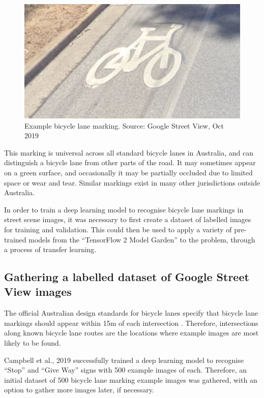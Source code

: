 \documentclass[11pt,twoside]{report}
\begin{document}
\begin{figure}[h]
\centering
\includegraphics{f001_symbol.png}
\caption{Example bicycle lane marking.  Source: Google Street View, Oct 2019}
\label{fig:symbol}
\end{figure}

This marking is universal across all standard bicycle lanes in Australia, and can distinguish a bicycle lane from other parts of the road.  It may sometimes appear on a green surface, and occasionally it may be partially occluded due to limited space or wear and tear.  Similar markings exist in many other jurisdictions outside Australia.

In order to train a deep learning model to recognise bicycle lane markings in street scene images, it was necessary to first create a dataset of labelled images for training and validation.  This could then be used to apply a variety of pre-trained models from the ``TensorFlow 2 Model Garden'' to the problem, through a process of transfer learning.

\subsection{Gathering a labelled dataset of Google Street View images}

The official Australian design standards for bicycle lanes specify that bicycle lane markings should appear within 15m of each intersection \cite{standards}.  Therefore, intersections along known bicycle lane routes are the locations where example images are most likely to be found.

Campbell et al., 2019 \cite{CAMPBELL2019101350} successfully trained a deep learning model to recognise ``Stop'' and ``Give Way'' signs with 500 example images of each.  Therefore, an initial dataset of 500 bicycle lane marking example images was gathered, with an option to gather more images later, if necessary.
\end{document}
